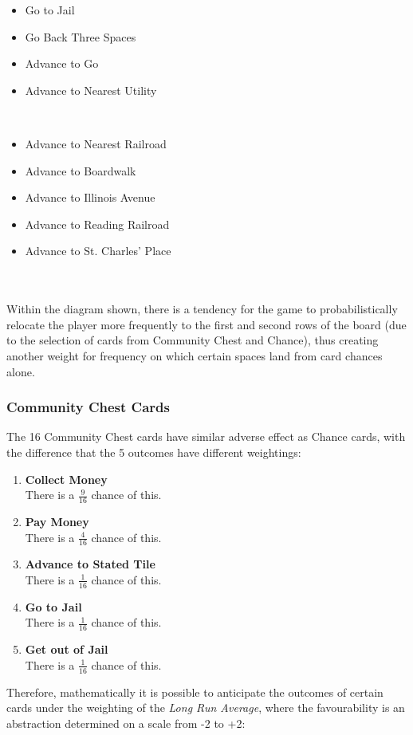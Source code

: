 \documentclass[12pt]{article}
\begin{document}
\begin{minipage}{0.5\textwidth}
\begin{flushleft}
\begin{itemize}
  \item {Go to Jail}
  \item {Go Back Three Spaces}
  \item {Advance to Go}
  \item {Advance to Nearest Utility}
\end{itemize}
\end{flushleft}
\end{minipage}
~
\begin{minipage}{0.5\textwidth}
\begin{flushleft} 
\begin{itemize}
  \item {Advance to Nearest Railroad}
  \item {Advance to Boardwalk}
  \item {Advance to Illinois Avenue}
  \item {Advance to Reading Railroad}
  \item {Advance to St. Charles' Place}
\end{itemize}
\end{flushleft}
\end{minipage}
\\
\\
Within the diagram shown, there is a tendency for the game to probabilistically relocate the player more frequently to the first and second rows of the board (due to the selection of cards from Community Chest and Chance), thus creating another weight for frequency on which certain spaces land from card chances alone.

\subsubsection{Community Chest Cards}
\label{Community Chest Probabilities}
The 16 Community Chest cards have similar adverse effect as Chance cards, with the difference that the 5 outcomes have different weightings:
\begin{enumerate}
  \item \textbf{Collect Money} \hfill\\
  There is a $\frac{9}{16}$ chance of this.
  \item \textbf{Pay Money} \hfill\\
  There is a $\frac{4}{16}$ chance of this.
  \item \textbf{Advance to Stated Tile} \hfill\\
  There is a $\frac{1}{16}$ chance of this.
  \item \textbf{Go to Jail} \hfill\\
  There is a $\frac{1}{16}$ chance of this.
  \item \textbf{Get out of Jail} \hfill\\
  There is a $\frac{1}{16}$ chance of this.
\end{enumerate}
Therefore, mathematically it is possible to anticipate the outcomes of certain cards under the weighting of the \emph{Long Run Average}, where the favourability is an abstraction determined on a scale from -2 to +2:
\end{document}
